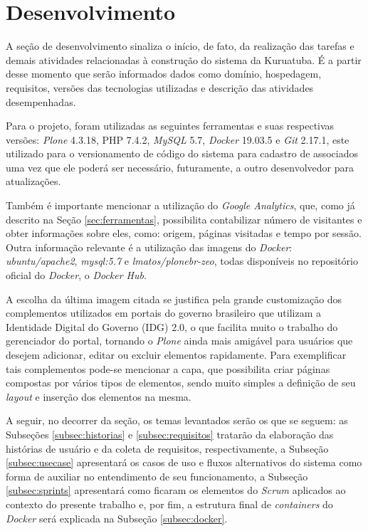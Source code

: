\hspace{2.5cm}
\section{Desenvolvimento}
\label{sec:desenvolvimento}

\hspace{2.5cm}

A seção de desenvolvimento sinaliza o início, de fato, da realização das tarefas e demais atividades relacionadas à construção do sistema da Kuruatuba. É a partir desse momento que serão informados dados como domínio, hospedagem, requisitos, versões das tecnologias utilizadas e descrição das atividades desempenhadas.

Para o projeto, foram utilizadas as seguintes ferramentas e suas respectivas versões: \textit{Plone} 4.3.18, PHP 7.4.2, \textit{MySQL} 5.7, \textit{Docker} 19.03.5 e \textit{Git} 2.17.1, este utilizado para o versionamento de código do sistema para cadastro de associados uma vez que ele poderá ser necessário, futuramente, a outro desenvolvedor para atualizações. 

Também é importante mencionar a utilização do \textit{Google Analytics}, que, como já descrito na Seção \ref{sec:ferramentas}, possibilita contabilizar número de visitantes e obter informações sobre eles, como: origem, páginas visitadas e tempo por sessão. Outra informação relevante é a utilização das imagens do \textit{Docker}: \textit{ubuntu/apache2}, \textit{mysql:5.7} e \textit{lmatos/plonebr-zeo}, todas disponíveis no repositório oficial do \textit{Docker}, o \textit{Docker Hub}. 

A escolha da última imagem citada se justifica pela grande customização dos complementos utilizados em portais do governo brasileiro que utilizam a Identidade Digital do Governo (IDG) 2.0, o que facilita muito o trabalho do gerenciador do portal, tornando o \textit{Plone} ainda mais amigável para usuários que desejem adicionar, editar ou excluir elementos rapidamente. Para exemplificar tais complementos pode-se mencionar a capa, que possibilita criar páginas compostas por vários tipos de elementos, sendo muito simples a definição de seu \textit{layout} e inserção dos elementos na mesma.  

A seguir, no decorrer da seção, os temas levantados serão os que se seguem: as Subseções \ref{subsec:historias} e \ref{subsec:requisitos} tratarão da elaboração das histórias de usuário e da coleta de requisitos, respectivamente, a Subseção \ref{subsec:usecase} apresentará os casos de uso e fluxos alternativos do sistema como forma de auxiliar no entendimento de seu funcionamento, a Subseção \ref{subsec:sprints} apresentará como ficaram os elementos do \textit{Scrum} aplicados ao contexto do presente trabalho e, por fim, a estrutura final de \textit{containers} do \textit{Docker} será explicada na Subseção \ref{subsec:docker}.

